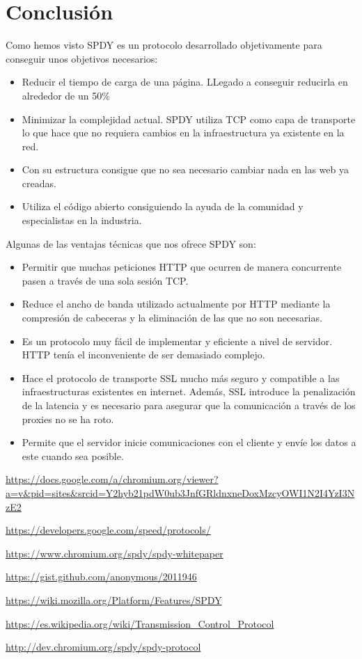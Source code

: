 \section{Conclusión}
Como hemos visto SPDY es un protocolo desarrollado objetivamente para conseguir unos objetivos necesarios:
\begin{itemize}
\item Reducir el tiempo de carga de una página. LLegado a conseguir reducirla en alrededor de un 50\%
\item Minimizar la complejidad actual. SPDY utiliza TCP como capa de transporte lo que hace que no requiera cambios en la infraestructura ya existente en la red.
\item Con su estructura consigue que no sea necesario cambiar nada en las web ya creadas.
\item Utiliza el código abierto consiguiendo la ayuda de la comunidad y especialistas en la industria.
\end{itemize}
Algunas de las ventajas técnicas que nos ofrece SPDY son:

\begin{itemize}
\item Permitir que muchas peticiones HTTP que ocurren de manera concurrente pasen a través de una sola sesión TCP.
\item Reduce el ancho de banda utilizado actualmente por HTTP mediante la compresión de cabeceras y la eliminación de las que no son necesarias.
\item Es un protocolo muy fácil de implementar y eficiente a nivel de servidor. HTTP tenía el inconveniente de ser demasiado complejo.
\item Hace el protocolo de transporte SSL mucho más seguro y compatible a las infraestructuras existentes en internet. Además, SSL introduce la penalización de la latencia y es necesario para asegurar que la comunicación a través de los proxies no se ha roto.
\item Permite que el servidor inicie comunicaciones con el cliente y envíe los datos a este cuando sea posible.
\end{itemize}


\begin{thebibliography}{a}
\url{https://docs.google.com/a/chromium.org/viewer?a=v&pid=sites&srcid=Y2hyb21pdW0ub3JnfGRldnxneDoxMzcyOWI1N2I4YzI3NzE2}

\url{https://developers.google.com/speed/protocols/}
 
\url{https://www.chromium.org/spdy/spdy-whitepaper}

\url{https://gist.github.com/anonymous/2011946}

\url{https://wiki.mozilla.org/Platform/Features/SPDY}

\url{https://es.wikipedia.org/wiki/Transmission_Control_Protocol}

\url{http://dev.chromium.org/spdy/spdy-protocol}

\end{thebibliography}


